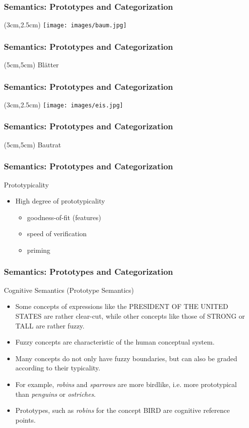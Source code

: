 \documentclass[12pt, table]{beamer}
\begin{document}
\begin{frame}
\frametitle{Semantics: Prototypes and Categorization}
\begin{textblock*}{1cm}(3cm,2.5cm)
\texttt{[image: images/baum.jpg]}
\end{textblock*}
\end{frame}

\begin{frame}
\frametitle{Semantics: Prototypes and Categorization}
\begin{textblock*}{2cm}(5cm,5cm)
\large{Bl{\"a}tter}
\end{textblock*}
\end{frame}

\begin{frame}
\frametitle{Semantics: Prototypes and Categorization}
\begin{textblock*}{1cm}(3cm,2.5cm)
\texttt{[image: images/eis.jpg]}
\end{textblock*}
\end{frame}

\begin{frame}
\frametitle{Semantics: Prototypes and Categorization}
\begin{textblock*}{2cm}(5cm,5cm)
\large{Bautrat}
\end{textblock*}
\end{frame}

\begin{frame}
\frametitle{Semantics: Prototypes and Categorization}
Prototypicality
\begin{itemize}
\item High degree of prototypicality
\begin{itemize}
\item goodness-of-fit (features)
\item speed of verification
\item priming
\end{itemize}
\end{itemize}
\end{frame}

\begin{frame}
\frametitle{Semantics: Prototypes and Categorization}
Cognitive Semantics (Prototype Semantics)
\begin{itemize}
\item Some concepts of expressions like the PRESIDENT OF THE UNITED STATES are rather clear-cut, while other concepts like those of STRONG or TALL are rather fuzzy. 
\item Fuzzy concepts are characteristic of the human conceptual system.
\item Many concepts do not only have fuzzy boundaries, but can also be graded according to their typicality.
\item For example, \textit{robins} and \textit{sparrows} are more birdlike, i.e. more prototypical than \textit{penguins} or \textit{ostriches}.
\item Prototypes, such as \textit{robins} for the concept BIRD are cognitive reference points. 
\end{itemize}
\end{frame}
\end{document}
